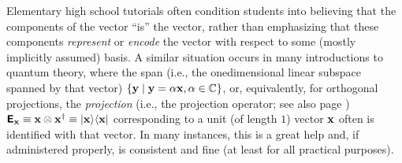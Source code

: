 Elementary high school tutorials often condition students into believing that the components of the vector
``is'' the vector, rather than emphasizing that these components {\em represent} or {\em encode}
the vector with respect to some (mostly implicitly assumed) basis.
A similar situation occurs in many introductions to quantum theory,
where the span
(i.e., the onedimensional linear subspace spanned by that vector)
$\{
{\bf y}
\mid
{\bf y} = \alpha {\bf x}, \alpha \in {\Bbb C}
\}$, or, equivalently,  for orthogonal projections,
the {\em projection} (i.e., the projection operator; see also page \pageref{2011-m-projec})
$\textsf{\textbf{E}}_{\bf x} \equiv {\bf x} \otimes {\bf x}^\dagger  \equiv \vert {\bf x} \rangle \langle {\bf x}\vert$
corresponding to a unit (of length $1$) vector ${\bf x}$
often is identified with that vector.
In many instances, this is a great help and,
if administered properly, is consistent and fine (at least for all practical purposes).

